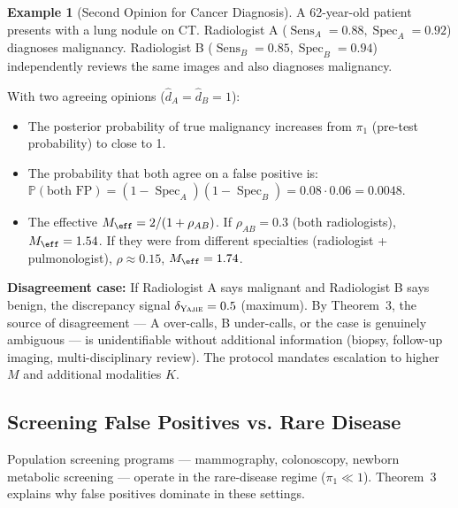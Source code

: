 \documentclass[11pt,a4paper]{article}
\theoremstyle{definition}
\newtheorem{example}[theorem]{Example}
\newcommand{\Yajie}{\textsc{Yajie}}
\DeclareMathOperator{\Sens}{Sens}
\DeclareMathOperator{\Spec}{Spec}
\newcommand{\Pbb}{\mathbb{P}}
\newcommand{\diagnosis}{\hat{d}}               %
\begin{document}
\begin{example}[Second Opinion for Cancer Diagnosis]
A 62-year-old patient presents with a lung nodule on CT. Radiologist A
($\Sens_A = 0.88, \Spec_A = 0.92$) diagnoses malignancy. Radiologist B
($\Sens_B = 0.85, \Spec_B = 0.94$) independently reviews the same images
and also diagnoses malignancy.

With two agreeing opinions ($\diagnosis_A = \diagnosis_B = 1$):
\begin{itemize}[nosep]
    \item The posterior probability of true malignancy increases from
    $\pi_1$ (pre-test probability) to close to 1.
    \item The probability that both agree on a false positive is:
    $\Pbb(\text{both FP}) = (1-\Spec_A)(1-\Spec_B) = 0.08 \cdot 0.06 = 0.0048$.
    \item The effective $M_{\eff} = 2/(1 + \rho_{AB})$. If $\rho_{AB} = 0.3$
    (both radiologists), $M_{\eff} = 1.54$. If they were from different
    specialties (radiologist + pulmonologist), $\rho \approx 0.15$,
    $M_{\eff} = 1.74$.
\end{itemize}

\textbf{Disagreement case:} If Radiologist A says malignant and Radiologist B
says benign, the discrepancy signal $\delta_{\Yajie} = 0.5$ (maximum).
By Theorem~3, the source of disagreement --- A over-calls, B under-calls,
or the case is genuinely ambiguous --- is unidentifiable without additional
information (biopsy, follow-up imaging, multi-disciplinary review).
The protocol mandates escalation to higher $M$ and additional modalities $K$.
\end{example}

\subsection{Screening False Positives vs. Rare Disease}

Population screening programs --- mammography, colonoscopy, newborn metabolic
screening --- operate in the rare-disease regime ($\pi_1 \ll 1$). Theorem~3
explains why false positives dominate in these settings.
\end{document}
